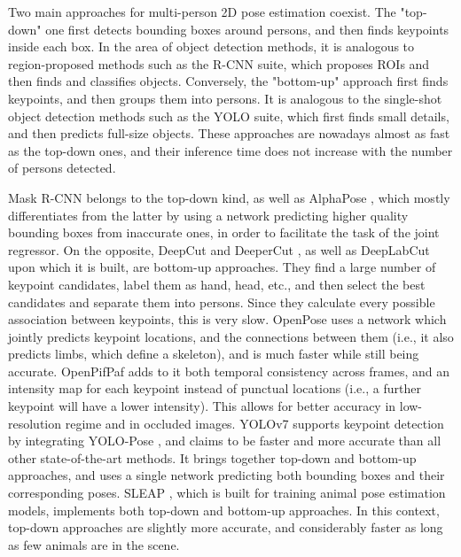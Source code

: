 Two main approaches for multi-person 2D pose estimation coexist. The "top-down" one first detects bounding boxes around persons, and then finds keypoints inside each box. In the area of object detection methods, it is analogous to region-proposed methods such as the R-CNN suite, which proposes ROIs and then finds and classifies objects. Conversely, the "bottom-up" approach first finds keypoints, and then groups them into persons. It is analogous to the single-shot object detection methods such as the YOLO suite, which first finds small details, and then predicts full-size objects. These approaches are nowadays almost as fast as the top-down ones, and their inference time does not increase with the number of persons detected. 

Mask R-CNN belongs to the top-down kind, as well as AlphaPose \cite{Fang2017}, which mostly differentiates from the latter by using a network predicting higher quality bounding boxes from inaccurate ones, in order to facilitate the task of the joint regressor. On the opposite, DeepCut and DeeperCut \cite{Pishchulin2016,Insafutdinov2016}, as well as DeepLabCut \cite{Mathis2018,Lauer2022} upon which it is built, are bottom-up approaches. They find a large number of keypoint candidates, label them as hand, head, etc., and then select the best candidates and separate them into persons. Since they calculate every possible association between keypoints, this is very slow. OpenPose \cite{Cao2019} uses a network which jointly predicts keypoint locations, and the connections between them (i.e., it also predicts limbs, which define a skeleton), and is much faster while still being accurate. OpenPifPaf \cite{Kreiss2021} adds to it both temporal consistency across frames, and an intensity map for each keypoint instead of punctual locations (i.e., a further keypoint will have a lower intensity). This allows for better accuracy in low-resolution regime and in occluded images. YOLOv7 supports keypoint detection by integrating YOLO-Pose \cite{Maji2022}, and claims to be faster and more accurate than all other state-of-the-art methods. It brings together top-down and bottom-up approaches, and uses a single network predicting both bounding boxes and their corresponding poses. SLEAP \cite{Pereira2022}, which is built for training animal pose estimation models, implements both top-down and bottom-up approaches. In this context, top-down approaches are slightly more accurate, and considerably faster as long as few animals are in the scene.

